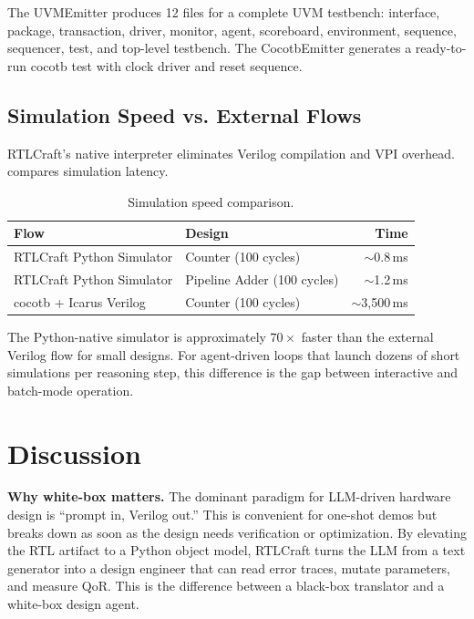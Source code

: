 \documentclass[11pt]{article}
\begin{document}
The UVMEmitter produces 12 files for a complete UVM testbench: interface, package, transaction, driver, monitor, agent, scoreboard, environment, sequence, sequencer, test, and top-level testbench. The CocotbEmitter generates a ready-to-run cocotb test with clock driver and reset sequence.

\subsection{Simulation Speed vs. External Flows}
\label{sec:exp_speed}

RTLCraft's native interpreter eliminates Verilog compilation and VPI overhead.  compares simulation latency.

\begin{table}[htbp]
\centering
\caption{Simulation speed comparison.}
\label{tab:sim_speed}
\begin{tabular}{@{}llr@{}}
    \toprule
    \textbf{Flow} & \textbf{Design} & \textbf{Time} \\
    \midrule
    RTLCraft Python Simulator & Counter (100 cycles) & $\sim$0.8\,ms \\
    RTLCraft Python Simulator & Pipeline Adder (100 cycles) & $\sim$1.2\,ms \\
    cocotb + Icarus Verilog & Counter (100 cycles) & $\sim$3,500\,ms \\
    \bottomrule
\end{tabular}
\end{table}

The Python-native simulator is approximately $70\times$ faster than the external Verilog flow for small designs. For agent-driven loops that launch dozens of short simulations per reasoning step, this difference is the gap between interactive and batch-mode operation.

\section{Discussion}
\label{sec:discussion}

\textbf{Why white-box matters.} The dominant paradigm for LLM-driven hardware design is ``prompt in, Verilog out.'' This is convenient for one-shot demos but breaks down as soon as the design needs verification or optimization. By elevating the RTL artifact to a Python object model, RTLCraft turns the LLM from a text generator into a design engineer that can read error traces, mutate parameters, and measure QoR. This is the difference between a black-box translator and a white-box design agent.
\end{document}
